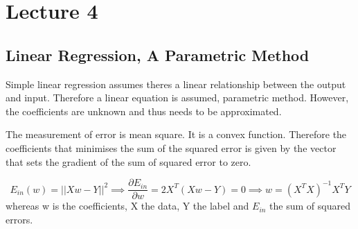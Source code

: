 \documentclass[12pt]{article}
\numberwithin{equation}{section}
\begin{document}
\section{Lecture 4}

\subsection{Linear Regression, A Parametric Method}
Simple linear regression assumes theres a linear relationship between the output and input. Therefore a linear equation is assumed, parametric method. However, the coefficients are unknown and thus needs to be approximated. 

The measurement of error is mean square. It is a convex function. Therefore the coefficients that minimises the sum of the squared error is given by the vector that sets the gradient of the sum of squared error to zero.

\begin{equation}
E_{in} (w) = ||Xw - Y ||^2 \implies \frac{\partial E_{in}}{\partial w} =  2X^T(Xw - Y) = 0 \implies w = (X^T X )^{-1}X^T Y
\end{equation}
whereas w is the coefficients, X the data, Y the label and $E_{in}$ the sum of squared errors.
\end{document}
